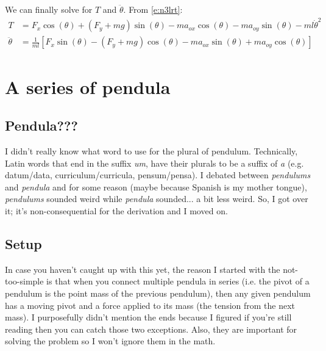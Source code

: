 \documentclass{article}
\newcommand{\nf}{F}              %
\newcommand{\nt}{T}              %
\newcommand{\aox}{a_{ox}}        %
\newcommand{\aoy}{a_{oy}}        %
\newcommand{\ntsp}{not-too-simple\xspace}
\begin{document}
We can finally solve for $\nt$ and $\ddot\theta$. From \cref{e:n3lrt}:
\begin{align}
  \nt&=
  \nf_x\cos(\theta)+\left(\nf_y+mg\right)\sin(\theta)-m\aox\cos(\theta)-m\aoy\sin(\theta)-ml{\dot\theta}^2
  \label{e:t}
  \\
  \ddot\theta&=
  \frac{1}{ml}\left[
    \nf_x\sin(\theta)-\left(\nf_y+mg\right)\cos(\theta)-m\aox\sin(\theta)+m\aoy\cos(\theta)
    \right]
  \label{e:ddt}
\end{align}

\section{A series of pendula}
\subsection{Pendula???}
I didn't really know what word to use for the plural of pendulum. Technically, Latin words that end in the suffix \emph{um}, have their plurals to be a suffix of \emph{a} (e.g. datum/data, curriculum/curricula, pensum/pensa). I debated between \emph{pendulums} and \emph{pendula} and for some reason (maybe because Spanish is my mother tongue), \emph{pendulums} sounded weird while \emph{pendula} sounded... a bit less weird. So, I got over it; it's non-consequential for the derivation and I moved on.

\subsection{Setup}
In case you haven't caught up with this yet, the reason I started with the \ntsp is that when you connect multiple pendula in series (i.e. the pivot of a pendulum is the point mass of the previous pendulum), then any given pendulum has a moving pivot and a force applied to its mass (the tension from the next mass). I purposefully didn't mention the ends because I figured if you're still reading then you can catch those two exceptions. Also, they are important for solving the problem so I won't ignore them in the math.
\end{document}
